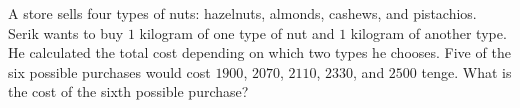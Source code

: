 A store sells four types of nuts: hazelnuts, almonds, cashews, and pistachios. Serik wants to buy $1$ kilogram of one type of nut and $1$ kilogram of another type. He calculated the total cost depending on which two types he chooses. Five of the six possible purchases would cost $1900$, $2070$, $2110$, $2330$, and $2500$ tenge. What is the cost of the sixth possible purchase?
